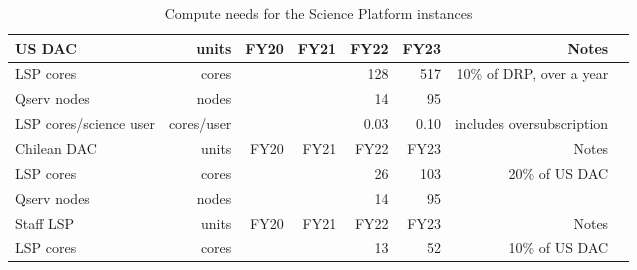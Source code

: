 \tiny \begin{longtable} { |p{}  |r  |r  |r  |r  |r  |r  |r |} 
\caption{Compute needs for the Science Platform instances \label{tab:lspSizing}}\\ 
\hline 
\textbf{US DAC}&\textbf{units}&\textbf{FY20}&\textbf{FY21}&\textbf{FY22}&\textbf{FY23}&\textbf{Notes} \\ \hline
{LSP cores}&{cores}&{}&{}&{128}&{517}&{10\% of DRP, over a year} \\ \hline
{Qserv nodes}&{nodes}&{}&{}&{14}&{95}& \\ \hline
{LSP cores/science user}&{cores/user}&{}&{}&{0.03}&{0.10}&{includes oversubscription} \\ \hline
{Chilean DAC}&{units}&{FY20}&{FY21}&{FY22}&{FY23}&{Notes} \\ \hline
{LSP cores}&{cores}&{}&{}&{26}&{103}&{20\% of US DAC} \\ \hline
{Qserv nodes}&{nodes}&{}&{}&{14}&{95}& \\ \hline
{Staff LSP}&{units}&{FY20}&{FY21}&{FY22}&{FY23}&{Notes} \\ \hline
{LSP cores}&{cores}&{}&{}&{13}&{52}&{10\% of US DAC} \\ \hline
\end{longtable} \normalsize
